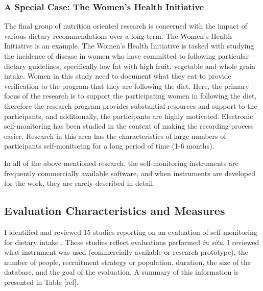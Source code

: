 \subsubsection{A Special Case: The Women's Health Initiative}
The final group of nutrition oriented research is concerned with the impact of various dietary recommendations over a long term. The Women's Health Initiative is an example. The Women's Health Initiative is tasked with studying the incidence of disease in women who have committed to following particular dietary guidelines, specifically low fat with high fruit, vegetable and whole grain intake. Women in this study need to document what they eat to provide verification to the program that they are following the diet. Here, the primary focus of the research is to support the participating women in following the diet, therefore the research program provides substantial resources and support to the participants, and additionally, the participants are highly motivated. Electronic self-monitoring has been studied in the context of making the recording process easier. Research in this area has the characteristics of large numbers of participants self-monitoring for a long period of time (1-6 months). 

In all of the above mentioned research, the self-monitoring instruments are frequently commercially available software, and when instruments are developed for the work, they are rarely described in detail. 


\subsection{Evaluation Characteristics and Measures}

I identified and reviewed 15 studies reporting on an evaluation of self-monitoring for dietary intake \citep{glanz_improving_2006, burke_effect_2011,fukuo_development_2009,atienza_using_2008, yon_personal_2007, acharya_using_2011, arsand_usability_2007,jarvinen_hyperfit:_2008, mattila_mobile_2008, kozakai_dietary_2006, reddy_image_2007, silva_sapofitness:_2011, tsai_usability_2007, wang_development_2006, long_effectiveness_2012}. These studies reflect evaluations performed \textit{in situ}. I reviewed what instrument was used (commercially available or research prototype), the number of people, recruitment strategy or population, duration, the size of the database, and the goal of the evaluation. A summary of this information is presented in Table [ref].  




